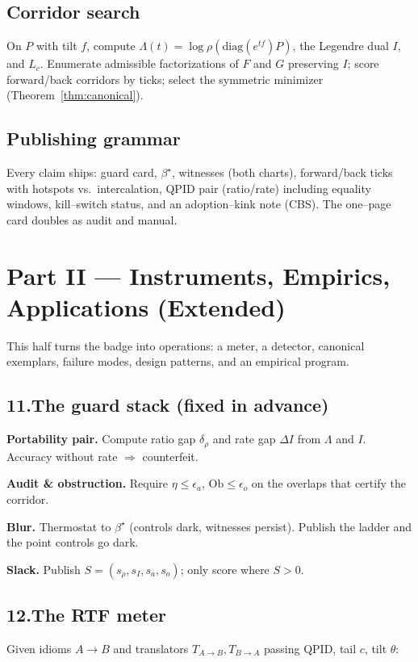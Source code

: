 \documentclass[11pt]{article}
\begin{document}
\subsection{Corridor search}
On $P$ with tilt $f$, compute $\Lambda(t)=\log\rho(\mathrm{diag}(e^{tf})P)$, the Legendre dual $I$, and $L_c$. Enumerate admissible factorizations of $F$ and $G$ preserving $I$; score forward/back corridors by ticks; select the symmetric minimizer (Theorem~\ref{thm:canonical}).

\subsection{Publishing grammar}
Every claim ships: guard card, $\beta^\star$, witnesses (both charts), forward/back ticks with hotspots vs.\ intercalation, QPID pair (ratio/rate) including equality windows, kill--switch status, and an adoption--kink note (CBS). The one--page card doubles as audit and manual.

\bigskip
\section*{Part II --- Instruments, Empirics, Applications (Extended)}
This half turns the badge into operations: a meter, a detector, canonical exemplars, failure modes, design patterns, and an empirical program.

\subsection*{11.\quad The guard stack (fixed in advance)}
\textbf{Portability pair.} Compute ratio gap $\delta_{\rho}$ and rate gap $\Delta I$ from $\Lambda$ and $I$. Accuracy without rate $\Rightarrow$ counterfeit.

\textbf{Audit \& obstruction.} Require $\eta\le\epsilon_a$, $\mathrm{Ob}\le\epsilon_o$ on the overlaps that certify the corridor.

\textbf{Blur.} Thermostat to $\beta^\star$ (controls dark, witnesses persist). Publish the ladder and the point controls go dark.

\textbf{Slack.} Publish $S=(s_{\rho}, s_I, s_a, s_o)$; only score where $S>0$.

\subsection*{12.\quad The RTF meter}
Given idioms $A\to B$ and translators $T_{A\to B},T_{B\to A}$ passing QPID, tail $c$, tilt $\theta$:
\end{document}
